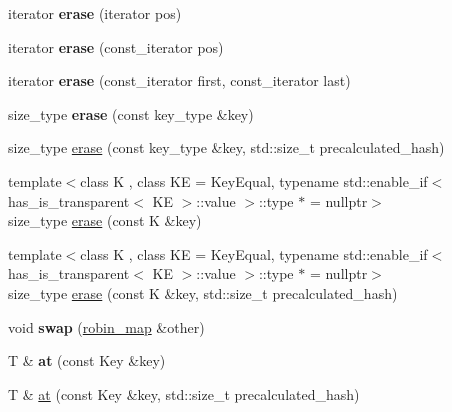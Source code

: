 \begin{DoxyCompactItemize}
iterator {\bfseries erase} (iterator pos)
\item 
\mbox{\label{classtsl_1_1robin__map_a39648511ddf344571816a9727c8d9154}} 
iterator {\bfseries erase} (const\+\_\+iterator pos)
\item 
\mbox{\label{classtsl_1_1robin__map_a61e72cb779de480d7508d4b038cc8276}} 
iterator {\bfseries erase} (const\+\_\+iterator first, const\+\_\+iterator last)
\item 
\mbox{\label{classtsl_1_1robin__map_a40442f96e17d19ef26b0934b35c95bbd}} 
size\+\_\+type {\bfseries erase} (const key\+\_\+type \&key)
\item 
size\+\_\+type \mbox{\hyperlink{classtsl_1_1robin__map_a5de84ecb7e8d4704ec9e5b2e7c8f5a88}{erase}} (const key\+\_\+type \&key, std\+::size\+\_\+t precalculated\+\_\+hash)
\item 
{\footnotesize template$<$class K , class KE  = Key\+Equal, typename std\+::enable\+\_\+if$<$ has\+\_\+is\+\_\+transparent$<$ K\+E $>$\+::value $>$\+::type $\ast$  = nullptr$>$ }\\size\+\_\+type \mbox{\hyperlink{classtsl_1_1robin__map_ad334f47f1ed306461539be804c5ec303}{erase}} (const K \&key)
\item 
{\footnotesize template$<$class K , class KE  = Key\+Equal, typename std\+::enable\+\_\+if$<$ has\+\_\+is\+\_\+transparent$<$ K\+E $>$\+::value $>$\+::type $\ast$  = nullptr$>$ }\\size\+\_\+type \mbox{\hyperlink{classtsl_1_1robin__map_a88c028cec7bc33ac26a4c2922a3a63ff}{erase}} (const K \&key, std\+::size\+\_\+t precalculated\+\_\+hash)
\item 
\mbox{\label{classtsl_1_1robin__map_ab5459876ab168b748e224224acae053e}} 
void {\bfseries swap} (\mbox{\hyperlink{classtsl_1_1robin__map}{robin\+\_\+map}} \&other)
\item 
\mbox{\label{classtsl_1_1robin__map_aa784818620dea2a270c3da852214b921}} 
T \& {\bfseries at} (const Key \&key)
\item 
T \& \mbox{\hyperlink{classtsl_1_1robin__map_a6aacb285c6f7b6ad7420c57f640ab8b6}{at}} (const Key \&key, std\+::size\+\_\+t precalculated\+\_\+hash)
\item 
\mbox{\label{classtsl_1_1robin__map_ab069fea0ce099f89a34dd8755c401b42}} 

\end{DoxyCompactItemize}

